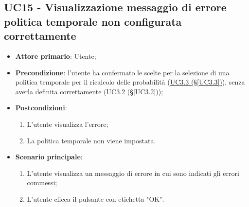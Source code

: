 \subsection{UC15 - Visualizzazione messaggio di errore politica temporale non configurata correttamente}\label{UC15}
\begin{itemize}
\item \textbf{Attore primario}: Utente;
\item \textbf{Precondizione}: l'utente ha confermato le scelte per la selezione di una politica temporale per il ricalcolo delle probabilità (\hyperref[UC3.3]{UC3.3 (§\ref*{UC3.3})}), senza averla definita correttamente (\hyperref[UC3.2]{UC3.2 (§\ref*{UC3.2})});
\item \textbf{Postcondizioni}: 
	\begin{enumerate}
	\item L'utente visualizza l'errore;
	\item La politica temporale non viene impostata.
	\end{enumerate}
\item \textbf{Scenario principale}: 
	\begin{enumerate}
	\item L'utente visualizza un messaggio di errore in cui sono indicati gli errori commessi;
	\item L'utente clicca il pulsante con etichetta "OK".
	\end{enumerate}
\end{itemize}



